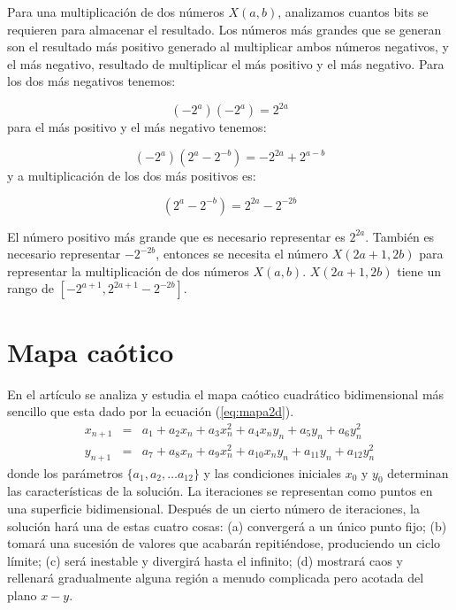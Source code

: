         Para una multiplicación de dos números $X(a,b)$, analizamos cuantos bits se requieren para almacenar el resultado. Los números más grandes que se generan son el resultado más positivo generado al multiplicar ambos números negativos, y el más negativo, resultado de multiplicar el más positivo y el más negativo. Para los dos más negativos tenemos:
        
        \begin{equation}
            (-2^{a})(-2^{a}) = 2^{2a}
        \end{equation}
        para el más positivo y el más negativo tenemos:
        
        \begin{equation}
            (-2^{a})(2^{a}-2^{-b}) = -2^{2a} + 2^{a-b}
        \end{equation}
        y a multiplicación de los dos más positivos es:

        \begin{equation}
            (2^{a} - 2^{-b}) = 2^{2a} - 2^{-2b}
        \end{equation}

        El número positivo más grande que es necesario representar es $2^{2a}$. También es necesario representar $-2^{-2b}$, entonces se necesita el número $X(2a+1,2b)$ para representar la multiplicación de dos números $X(a,b)$. $X(2a+1,2b)$ tiene un rango de $[-2^{a+1}, 2^{2a+1} - 2^{-2b}]$.

        
	\section{Mapa caótico}
    
        En el artículo \cite{Sprott1993} se analiza y estudia el mapa caótico cuadrático bidimensional más sencillo que esta dado por la ecuación (\ref{eq:mapa2d}). 
        \begin{equation}
            \begin{array}{ccl}
                x_{n+1} & = &  a_{1} + a_{2}x_{n} + a_{3}x_{n}^{2} + a_{4}x_{n}y_{n} + a_{5}y_{n} + a_{6}y_{n}^{2}\\
                y_{n+1} & = &  a_{7} + a_{8}x_{n} + a_{9}x_{n}^{2} + a_{10}x_{n}y_{n} + a_{11}y_{n} + a_{12}y_{n}^{2}
            \end{array}
            \label{eq:mapa2d}
        \end{equation}
        donde los parámetros $\{a_{1}, a_{2}, \ldots a_{12}\}$ y las condiciones iniciales $x_{0}$ y $y_{0}$ determinan las características de la solución. La iteraciones se representan como puntos en una superficie bidimensional. Después de un cierto número de iteraciones, la solución hará una de estas cuatro cosas: (a) convergerá a un único punto fijo; (b) tomará una sucesión de valores que acabarán repitiéndose, produciendo un ciclo límite; (c) será inestable y divergirá hasta el infinito; (d) mostrará caos y rellenará gradualmente alguna región a menudo complicada pero acotada del plano $x-y$.
        
